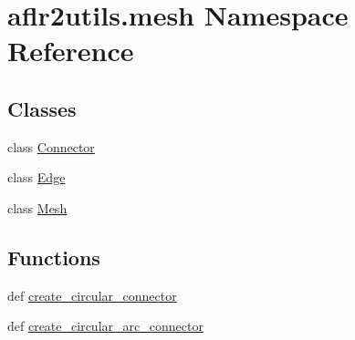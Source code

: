 \hypertarget{namespaceaflr2utils_1_1mesh}{\section{aflr2utils.\-mesh Namespace Reference}
\label{namespaceaflr2utils_1_1mesh}
}
\subsection*{Classes}
\begin{DoxyCompactItemize}
\item 
class \hyperlink{classaflr2utils_1_1mesh_1_1Connector}{Connector}
\item 
class \hyperlink{classaflr2utils_1_1mesh_1_1Edge}{Edge}
\item 
class \hyperlink{classaflr2utils_1_1mesh_1_1Mesh}{Mesh}
\end{DoxyCompactItemize}
\subsection*{Functions}
\begin{DoxyCompactItemize}
\item 
def \hyperlink{namespaceaflr2utils_1_1mesh_a49beb6674c45ee74fd63b44cb4093a77}{create\-\_\-circular\-\_\-connector}
\item 
def \hyperlink{namespaceaflr2utils_1_1mesh_a9e5f560d8e1b657f0099b3372ebbf4be}{create\-\_\-circular\-\_\-arc\-\_\-connector}
\end{DoxyCompactItemize}


